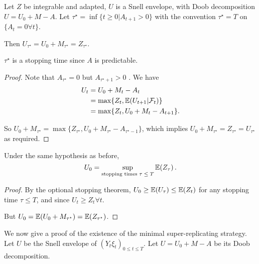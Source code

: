 \begin{thm}
  \label{defn:discrete_time_models:32}
  Let $Z$ be integrable and adapted, $U$ is a Snell envelope, with
  Doob decomposition $U = U_{0} + M - A$.  Let $\tau^{\star} = \inf \{
  t \geq 0 | A_{t + 1} > 0 \}$ with the convention $\tau^{\star} = T$
  on $\{ A_{t} = 0 \forall t \}$.

  Then $U_{\tau^{\star}} = U_{0} + M_{\tau^{\star}} = Z_{\tau^{\star}}$.
\end{thm}

\begin{remark}
  $\tau^{\star}$ is a stopping time since $A$ is predictable.
\end{remark}

\begin{proof}
  Note that $A_{\tau^{\star}} = 0$ but $A_{\tau^{\star} + 1} > 0$ .
  We have
  \begin{align}
    \label{eq:153}
    U_{t} &= U_{0} + M_{t} - A_{t} \\
    &= \max \{ Z_{t}, \E{U_{t+1} | \mathcal{F}_{t}}  \} \\
    &= \max \{ Z_{t}, U_{0} + M_{t} - A_{t+1} \}.
  \end{align}


  So $U_{0} + M_{\tau^{\star}} = \max \{ Z_{\tau^{\star}}, U_{0} +
  M_{\tau^{\star}} - A_{\tau^{\star} - 1} \}$, which implies $U_{0} +
  M_{\tau^{\star}}= Z_{\tau^{\star}} = U_{\tau^{\star}}$ as required.
\end{proof}

\begin{thm}
  \label{defn:discrete_time_models:33}
  Under the same hypothesis as before,
  \begin{equation}
    \label{eq:27}
    U_{0} = \sup_{\text{stopping times $\tau \leq T$}} \E{Z_{\tau}}.
  \end{equation}
\end{thm}

\begin{proof}
  By the optional stopping theorem, $U_{0} \geq \E{U_{\tau}} \leq \E{Z_{t}}$ for any
  stopping time $\tau \leq T$, and since $U_{t} \geq Z_{t} \forall t$.

  But $U_{0} = \E{U_{0} + M_{\tau^{\star}}} = \E{Z_{\tau^{\star}}}$.
\end{proof}

We now give a proof of the existence of the minimal super-replicating
strategy. Let $U$ be the Snell envelope of $(Y_{t} \xi_{t})_{0 \leq t
  \leq T}$. Let $U = U_{0} +M - A$ be its Doob decomposition.

